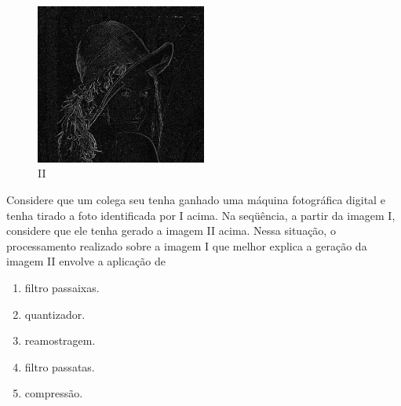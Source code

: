 \documentclass{exam}
\begin{document}
\begin{questions}
\begin{figure}[H]
	\begin{center}
		\includegraphics[width=0.5\textwidth]{CIENCIA_DA_COMPUTACAO_Prova2005-utf8_figuras/fig-0028.jpg}
		\caption{II}
	\end{center}
\end{figure}
Considere que um colega seu tenha ganhado uma máquina
fotográfica digital e tenha tirado a foto identificada por I acima.
Na seqüência, a partir da imagem I, considere que ele tenha
gerado a imagem II acima. Nessa situação, o processamento
realizado sobre a imagem I que melhor explica a geração da
imagem II envolve a aplicação de
	\begin{enumerate}[label=\alph*)]
		\item  filtro passaixas.
		\item  quantizador.
		\item  reamostragem.
		\item  filtro passatas.
		\item  compressão.
	\end{enumerate}


\end{questions}
\end{document}

